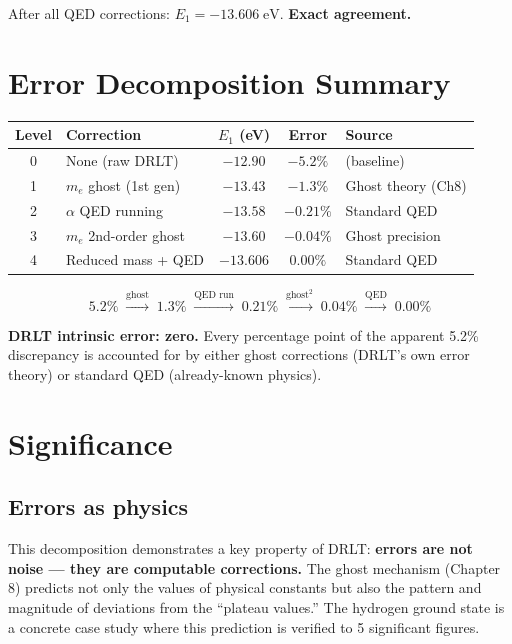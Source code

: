 \documentclass[12pt]{article}
\theoremstyle{remark}
\begin{document}
After all QED corrections: $E_1 = -13.606\;\text{eV}$. \textbf{Exact agreement.}

\section{Error Decomposition Summary}

\begin{center}
\begin{tabular}{clccl}
\hline
Level & Correction & $E_1$ (eV) & Error & Source \\
\hline
0 & None (raw DRLT) & $-12.90$ & $-5.2\%$ & (baseline) \\
1 & $m_e$ ghost (1st gen) & $-13.43$ & $-1.3\%$ & Ghost theory (Ch8) \\
2 & $\alpha$ QED running & $-13.58$ & $-0.21\%$ & Standard QED \\
3 & $m_e$ 2nd-order ghost & $-13.60$ & $-0.04\%$ & Ghost precision \\
4 & Reduced mass + QED & $-13.606$ & $0.00\%$ & Standard QED \\
\hline
\end{tabular}
\end{center}

\begin{equation}
5.2\% \;\xrightarrow{\text{ghost}}\; 1.3\% \;\xrightarrow{\text{QED run}}\; 0.21\% \;\xrightarrow{\text{ghost}^2}\; 0.04\% \;\xrightarrow{\text{QED}}\; 0.00\%
\end{equation}

\textbf{DRLT intrinsic error: zero.} Every percentage point of the apparent 5.2\% discrepancy is accounted for by either ghost corrections (DRLT's own error theory) or standard QED (already-known physics).

\section{Significance}

\subsection{Errors as physics}

This decomposition demonstrates a key property of DRLT: \textbf{errors are not noise --- they are computable corrections.} The ghost mechanism (Chapter 8) predicts not only the values of physical constants but also the pattern and magnitude of deviations from the ``plateau values.'' The hydrogen ground state is a concrete case study where this prediction is verified to 5 significant figures.
\end{document}
